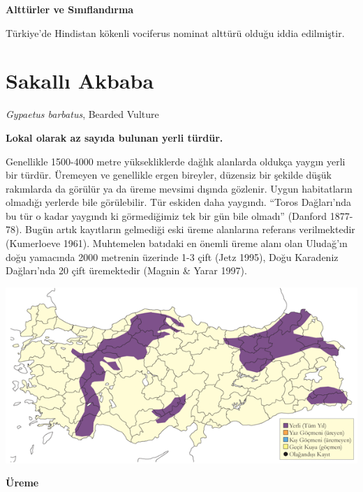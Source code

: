 \documentclass[
  letterpaper,
  DIV=11,
  numbers=noendperiod]{scrreprt}
\begin{document}
\textbf{Alttürler ve Sınıflandırma}

Türkiye'de Hindistan kökenli vociferus nominat alttürü olduğu iddia
edilmiştir.

\section{Sakallı Akbaba}\label{sakallux131-akbaba}

\emph{Gypaetus barbatus}, Bearded Vulture

\textbf{Lokal olarak az sayıda bulunan yerli türdür.}

Genellikle 1500-4000 metre yüksekliklerde dağlık alanlarda oldukça
yaygın yerli bir türdür. Üremeyen ve genellikle ergen bireyler, düzensiz
bir şekilde düşük rakımlarda da görülür ya da üreme mevsimi dışında
gözlenir. Uygun habitatların olmadığı yerlerde bile görülebilir. Tür
eskiden daha yaygındı. ``Toros Dağları'nda bu tür o kadar yaygındı ki
görmediğimiz tek bir gün bile olmadı'' (Danford 1877-78). Bugün artık
kayıtların gelmediği eski üreme alanlarına referans verilmektedir
(Kumerloeve 1961). Muhtemelen batıdaki en önemli üreme alanı olan
Uludağ'ın doğu yamacında 2000 metrenin üzerinde 1-3 çift (Jetz 1995),
Doğu Karadeniz Dağları'nda 20 çift üremektedir (Magnin \& Yarar 1997).

\includegraphics{images/harita_Page_083.png}

\textbf{Üreme}
\end{document}
